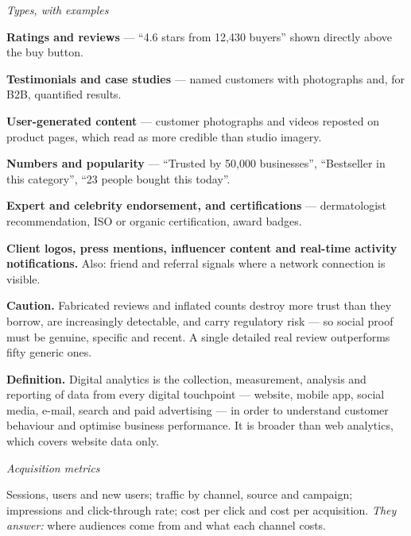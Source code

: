\begin{qlist}
\textit{Types, with examples}
\begin{apts}\setcounter{enumi}{4}
\item \textbf{Ratings and reviews} --- ``4.6 stars from 12{,}430 buyers'' shown
      directly above the buy button.
\item \textbf{Testimonials and case studies} --- named customers with
      photographs and, for B2B, quantified results.
\item \textbf{User-generated content} --- customer photographs and videos
      reposted on product pages, which read as more credible than studio
      imagery.
\item \textbf{Numbers and popularity} --- ``Trusted by 50{,}000 businesses'',
      ``Bestseller in this category'', ``23 people bought this today''.
\item \textbf{Expert and celebrity endorsement, and certifications} ---
      dermatologist recommendation, ISO or organic certification, award badges.
\item \textbf{Client logos, press mentions, influencer content and real-time
      activity notifications.} Also: friend and referral signals where a network
      connection is visible.
\end{apts}

\textbf{Caution.} Fabricated reviews and inflated counts destroy more trust than
they borrow, are increasingly detectable, and carry regulatory risk --- so social
proof must be genuine, specific and recent. A single detailed real review
outperforms fifty generic ones.

\textbf{Definition.} Digital analytics is the collection, measurement, analysis
and reporting of data from every digital touchpoint --- website, mobile app,
social media, e-mail, search and paid advertising --- in order to understand
customer behaviour and optimise business performance. It is broader than web
analytics, which covers website data only.

\textit{Acquisition metrics}
\begin{apts}
\item Sessions, users and new users; traffic by channel, source and campaign;
      impressions and click-through rate; cost per click and cost per
      acquisition. \emph{They answer:} where audiences come from and what each
      channel costs.
\end{apts}


\end{qlist}
